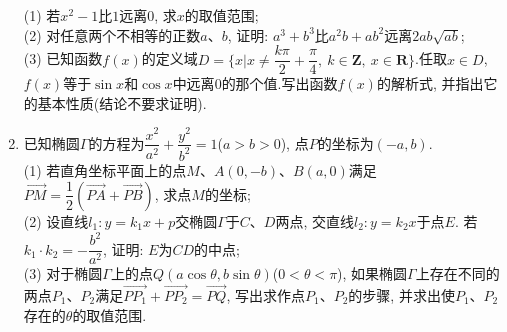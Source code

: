 \documentclass[10pt,a4paper]{article}
\begin{document}
\begin{enumerate}[1.]
(1) 若$x^2-1$比$1$远离$0$, 求$x$的取值范围;\\
(2) 对任意两个不相等的正数$a$、$b$, 证明: $a^3+b^3$比$a^2b+ab^2$远离$2ab\sqrt {ab}$;\\
(3) 已知函数$f(x)$的定义域$D=\{x| x\ne \dfrac{k\pi }2+\dfrac{\pi }4, \ k\in \mathbf{Z}, \ x\in \mathbf{R}\}$.任取$x\in D$, $f(x)$等于$\sin x$和$\cos x$中远离$0$的那个值.写出函数$f(x)$的解析式, 并指出它的基本性质(结论不要求证明).
\item 已知椭圆$\Gamma$的方程为$\dfrac{x^2}{a^2}+\dfrac{y^2}{b^2}=1$($a>b>0$), 点$P$的坐标为$(-a, b)$.\\
(1) 若直角坐标平面上的点$M$、$A(0, -b)$、$B(a, 0)$满足$\overrightarrow{PM}=\dfrac{1}{2}(\overrightarrow{PA}+\overrightarrow{PB})$, 求点$M$的坐标;\\
(2) 设直线$l_1:y=k_1x+p$交椭圆$\Gamma$于$C$、$D$两点, 交直线$l_2:y=k_2x$于点$E$. 若$k_1\cdot k_2=-\dfrac{b^2}{a^2}$, 证明: $E$为$CD$的中点;\\
(3) 对于椭圆$\Gamma$上的点$Q(a \cos\theta , b \sin\theta )$($0<\theta <\pi$), 如果椭圆$\Gamma$上存在不同的两点$P_1$、$P_2$满足$\overrightarrow{PP_1}+\overrightarrow{PP_2}=\overrightarrow{PQ}$, 写出求作点$P_1$、$P_2$的步骤, 并求出使$P_1$、$P_2$存在的$\theta$的取值范围.


\end{enumerate}
\iffalse















\fi
\end{document}
